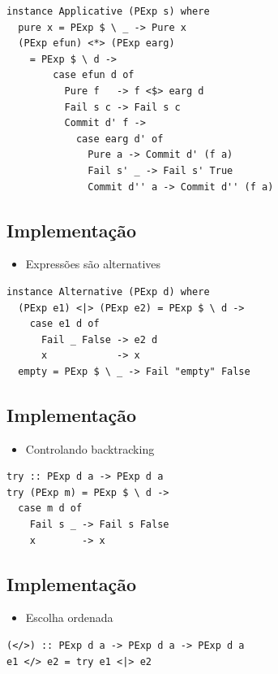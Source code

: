 \documentclass[11pt]{article}
\begin{document}
\begin{verbatim}
instance Applicative (PExp s) where
  pure x = PExp $ \ _ -> Pure x
  (PExp efun) <*> (PExp earg)
    = PExp $ \ d ->
        case efun d of
          Pure f   -> f <$> earg d
          Fail s c -> Fail s c
          Commit d' f ->
            case earg d' of
              Pure a -> Commit d' (f a)
              Fail s' _ -> Fail s' True
              Commit d'' a -> Commit d'' (f a)
\end{verbatim}
\subsection*{Implementação}
\label{sec:orgdb97817}

\begin{itemize}
\item Expressões são alternatives
\end{itemize}

\begin{verbatim}
instance Alternative (PExp d) where
  (PExp e1) <|> (PExp e2) = PExp $ \ d ->
    case e1 d of
      Fail _ False -> e2 d
      x            -> x
  empty = PExp $ \ _ -> Fail "empty" False
\end{verbatim}
\subsection*{Implementação}
\label{sec:org2e8dd29}

\begin{itemize}
\item Controlando backtracking
\end{itemize}

\begin{verbatim}
try :: PExp d a -> PExp d a
try (PExp m) = PExp $ \ d ->
  case m d of
    Fail s _ -> Fail s False
    x        -> x
\end{verbatim}
\subsection*{Implementação}
\label{sec:orga0c17fb}

\begin{itemize}
\item Escolha ordenada
\end{itemize}

\begin{verbatim}
(</>) :: PExp d a -> PExp d a -> PExp d a
e1 </> e2 = try e1 <|> e2
\end{verbatim}
\end{document}

